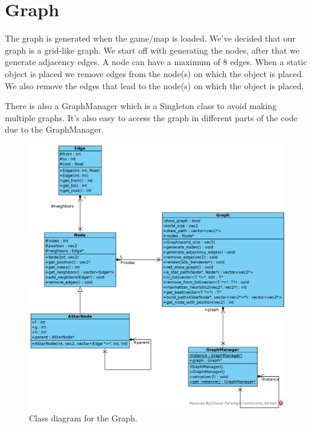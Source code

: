 \section{Graph} 
The graph is generated when the game/map is loaded. We’ve decided that our 
graph is a grid-like graph. We start off with generating the nodes, after that 
we generate adjacency edges. A node can have a maximum of 8 edges. When a 
static object is placed we remove edges from the node(s) on which the object 
is placed. We also remove the edges that lead to the node(s) on which the 
object is placed.

There is also a GraphManager which is a Singleton class to avoid making 
multiple graphs. It's also easy to access the graph in different parts of the 
code due to the GraphManager. 

\begin{figure}[H] 
    \centering 
    \includegraphics[scale=0.75]{res/graph.jpg}
    \caption{Class diagram for the Graph.}\label{fig:blue-line} 
\end{figure}
